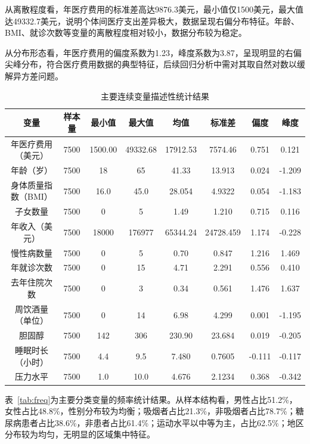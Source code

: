 \documentclass[a4paper]{ctexart}
\begin{document}
从离散程度看，年医疗费用的标准差高达9876.3美元，最小值仅1500美元，最大值达49332.7美元，说明个体间医疗支出差异极大，数据呈现右偏分布特征。年龄、BMI、就诊次数等变量的离散程度相对较小，数据分布较为稳定。

从分布形态看，年医疗费用的偏度系数为1.23，峰度系数为3.87，呈现明显的右偏尖峰分布，符合医疗费用数据的典型特征，后续回归分析中需对其取自然对数以缓解异方差问题。

\begin{table}[H]
\centering
\caption{主要连续变量描述性统计结果}
\label{tab:desc}
\begin{tabular}{c c c c c c c c}
\toprule
变量 & 样本量 & 最小值 & 最大值 & 均值 & 标准差 & 偏度 & 峰度 \\
\midrule
年医疗费用（美元） & 7500 & 1500.00 & 49332.68 & 17912.53 & 7574.46 & 0.751 & 0.121 \\
年龄（岁） & 7500 & 18 & 65 & 41.33 & 13.913 & 0.024 & -1.209 \\
身体质量指数（BMI） & 7500 & 16.0 & 45.0 & 28.054 & 4.9322 & 0.054 & -1.183 \\
子女数量 & 7500 & 0 & 5 & 1.49 & 1.210 & 0.715 & 0.116 \\
年收入（美元） & 7500 & 18000 & 176977 & 65344.24 & 24728.459 & 1.174 & -0.228 \\
慢性病数量 & 7500 & 0 & 5 & 0.70 & 0.847 & 1.216 & 1.469 \\
年就诊次数 & 7500 & 0 & 15 & 4.71 & 2.291 & 0.556 & 0.410 \\
去年住院次数 & 7500 & 0 & 3 & 0.34 & 0.561 & 1.476 & 1.637 \\
周饮酒量（单位） & 7500 & 0 & 14 & 6.98 & 4.299 & 0.001 & -1.195 \\
胆固醇 & 7500 & 142 & 306 & 230.90 & 23.684 & 0.019 & -0.205 \\
睡眠时长（小时） & 7500 & 4.4 & 9.5 & 7.480 & 0.7605 & -0.111 & -0.117 \\
压力水平 & 7500 & 1.0 & 10.0 & 4.676 & 2.1234 & 0.368 & -0.342 \\
\bottomrule
\end{tabular}
\end{table}

表~\ref{tab:freq}为主要分类变量的频率统计结果。从样本结构看，男性占比51.2\%，女性占比48.8\%，性别分布较为均衡；吸烟者占比21.3\%，非吸烟者占比78.7\%；糖尿病患者占比38.6\%，非患者占比61.4\%；运动水平以中等为主，占比62.5\%；地区分布较为均匀，无明显的区域集中特征。
\end{document}
